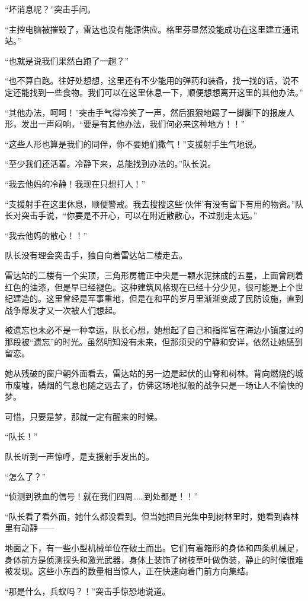 “坏消息呢？”突击手问。

“主控电脑被摧毁了，雷达也没有能源供应。格里芬显然没能成功在这里建立通讯站。”

“也就是说我们果然白跑了一趟？”

“也不算白跑。往好处想想，这里还有不少能用的弹药和装备，找一找的话，说不定还能找到一些食物。我们可以在这里休息一下，顺便想想离开这里的其他办法。”

“其他办法，呵呵！”突击手气得冷笑了一声，然后狠狠地踢了一脚脚下的报废人形，发出一声闷响，“要是有其他办法，我们何必来这种地方！！”

“这些人形也算是我们的同伴，你不要她们撒气！”支援射手生气地说。

“至少我们还活着。冷静下来，总能找到办法的。”队长说。

“我去他妈的冷静！我现在只想打人！”

“支援射手在这里休息，顺便警戒。我去搜搜这些‘伙伴’有没有留下有用的物资。”队长对突击手说，“你要是不开心，可以在附近散散心，不过别走太远。”

“我去他妈的散心！！”

队长没有理会突击手，独自向着雷达站二楼走去。

雷达站的二楼有一个尖顶，三角形房檐正中央是一颗水泥抹成的五星，上面曾刷着红色的油漆，但是早已经褪色。这种建筑风格现在已经十分少见，很可能是上个世纪建造的。这里曾经是军事重地，但是在和平的岁月里渐渐变成了民防设施，直到战争爆发才又一次被人们想起。

被遗忘也未必不是一种幸运，队长心想，她想起了自己和指挥官在海边小镇度过的那段被“遗忘”的时光。虽然明知没有未来，但那须臾的宁静和安详，依然让她感到留恋。

她从残破的窗户朝外面看去，雷达站的另一边是起伏的山脊和树林。背向燃烧的城市废墟，硝烟的气息也随之远去了，仿佛这场地狱般的战争只是一场让人不愉快的梦。

可惜，只要是梦，那就一定有醒来的时候。

“队长！”

队长听到一声惊呼，是支援射手发出的。

“怎么了？”

“侦测到铁血的信号！就在我们四周……到处都是！！”

“队长看了看外面，她什么都没看到。但当她把目光集中到树林里时，她看到森林里有动静——

地面之下，有一些小型机械单位在破土而出。它们有着箱形的身体和四条机械足，身体前方是侦测探头和激光武器，身体上装饰了树枝草叶做伪装，静止的时候很难被发现。这些小东西的数量相当惊人，正在快速向着门前方向集结。

“那是什么，兵蚁吗？！”突击手惊恐地说道。

